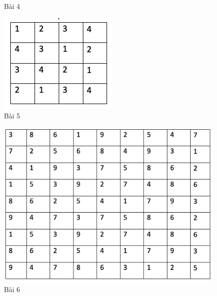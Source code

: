 \begin{multicols}{2}
\begin{figure}[H]
		\caption{\small{Bài 4}}
		\vspace*{-10pt}
	\end{figure}
	\begin{figure}[H]
		\centering
		\vspace*{-5pt}
		\captionsetup{labelformat= empty, justification=centering}
		\includegraphics[width=0.9\linewidth]{sudoku5.png}
		\caption{\small{Bài 5}}
		\vspace*{-10pt}
	\end{figure}
	\begin{figure}[H]
		\centering
		\vspace*{-5pt}
		\captionsetup{labelformat= empty, justification=centering}
		\includegraphics[width=0.9\linewidth]{sudoku6.png}
		\caption{\small{Bài 6}}
		\vspace*{-10pt}
	\end{figure}
\end{multicols}
